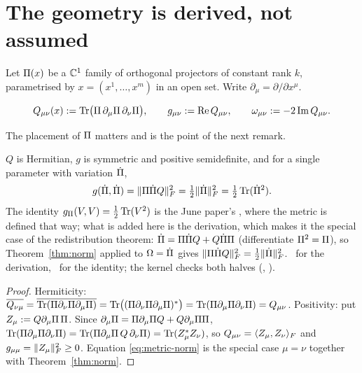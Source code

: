 \section{The geometry is derived, not assumed}\label{sec:geometry}

Let $\Pi(x)$ be a $\mathbb{C}^1$ family of orthogonal projectors of constant rank $k$, parametrised by
$x=(x^1,\dots,x^m)$ in an open set. Write $\partial_\mu=\partial/\partial x^\mu$.

\begin{definition}\label{def:qgt}
\begin{equation}\label{eq:qgt}
   Q_{\mu\nu}(x):=\operatorname{Tr}\bigl(\Pi\,\partial_\mu\Pi\,\partial_\nu\Pi\bigr),\qquad
   g_{\mu\nu}:=\operatorname{Re}Q_{\mu\nu},\qquad
   \omega_{\mu\nu}:=-2\operatorname{Im}Q_{\mu\nu}.
\end{equation}
\end{definition}

The placement of $\Pi$ matters and is the point of the next remark.

\begin{theorem}\label{thm:qgt}
$Q$ is Hermitian, $g$ is symmetric and positive semidefinite, and for a single parameter with
variation $\dot{\Pi}$,
\begin{equation}\label{eq:metric-norm}
   g(\dot{\Pi},\dot{\Pi})=\lVert\Pi\dot{\Pi}Q\rVert_F^2=\tfrac12\lVert\dot{\Pi}\rVert_F^2=\tfrac12\operatorname{Tr}(\dot{\Pi}^2).
\end{equation}
The identity $g_\Pi(V,V)=\tfrac12\operatorname{Tr}(V^2)$ is the June paper's \Cc{} \cite{corpus}, where
the metric is defined that way; what is added here is the derivation, which makes it the
special case of the redistribution theorem: $\dot{\Pi}=\Pi\dot{\Pi}Q+Q\dot{\Pi}\Pi$
(differentiate $\Pi^2=\Pi$), so Theorem~\ref{thm:norm} applied to $\Omega=\dot{\Pi}$ gives
$\lVert\Pi\dot{\Pi}Q\rVert_F^2=\tfrac12\lVert\dot{\Pi}\rVert_F^2$. \T\ for the derivation, \Cc\ for the
identity; the kernel checks both halves (,
).
\end{theorem}

\begin{proof}
Hermiticity: $\overline{Q_{\nu\mu}}=\overline{\operatorname{Tr}(\Pi\partial_\nu\Pi\partial_\mu\Pi)}=\operatorname{Tr}\bigl((\Pi\partial_\nu\Pi\partial_\mu\Pi)^*\bigr)=\operatorname{Tr}(\Pi\partial_\mu\Pi\partial_\nu\Pi)=Q_{\mu\nu}$.
Positivity: put $Z_\mu:=Q\partial_\mu\Pi\,\Pi$. Since $\partial_\mu\Pi=\Pi\partial_\mu\Pi Q+Q\partial_\mu\Pi\Pi$,
$\operatorname{Tr}(\Pi\partial_\mu\Pi\partial_\nu\Pi)=\operatorname{Tr}(\Pi\partial_\mu\Pi\,Q\,\partial_\nu\Pi)=\operatorname{Tr}(Z_\mu^*Z_\nu)$,
so $Q_{\mu\nu}=\langle Z_\mu,Z_\nu\rangle_F$ and $g_{\mu\mu}=\lVert Z_\mu\rVert_F^2\ge0$. Equation
\eqref{eq:metric-norm} is the special case $\mu=\nu$ together with Theorem~\ref{thm:norm}.
\end{proof}

